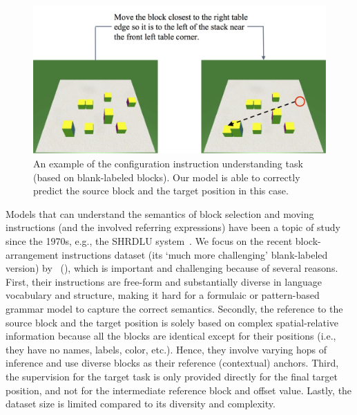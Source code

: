 \documentclass[letterpaper]{article} %
\newcommand{\newcite}[1]{\citeauthor{#1} (\citeyear{#1})}
\begin{document}
\begin{figure}
\centering
\includegraphics[width=0.98\linewidth]{Intro_sample.jpg}
\caption{An example of the configuration instruction understanding task (based on blank-labeled blocks). Our model is able to correctly predict the source block and the target position in this case. 
}
\label{fig:problem}
\end{figure}


Models that can understand the semantics of block selection and moving instructions (and the involved referring expressions) have been a topic of study since the 1970s, e.g., the SHRDLU system~\cite{winograd72}.
We focus on the recent block-arrangement instructions dataset (its `much more challenging' blank-labeled version) by~\newcite{bisk2016natural}, which is important and challenging because of several reasons. 
First, their instructions are free-form and substantially diverse in language vocabulary and structure, making it hard for a formulaic or pattern-based grammar model to capture the correct semantics. Secondly, the reference to the source block and the target position is solely based on complex spatial-relative information because all the blocks are identical except for their positions (i.e., they have no names, labels, color, etc.). Hence, they involve varying hops of inference and use diverse blocks as their reference (contextual) anchors. Third, the supervision for the target task is only provided directly for the final target position, and not for the intermediate reference block and offset value. Lastly, the dataset size is limited compared to its diversity and complexity.
%
\end{document}
